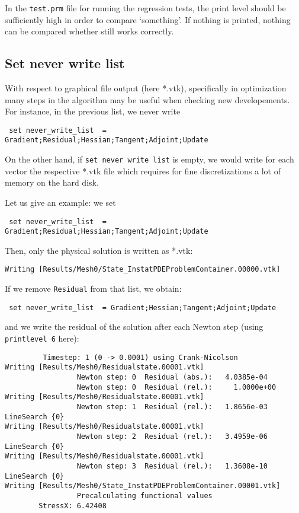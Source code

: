 \begin{remark}
In the \texttt{test.prm} file for running the regression tests, the print
level 
should be sufficiently high in order to compare `something'. If nothing 
is printed, nothing can be compared whether \dope{} still works correctly.
\end{remark}


\subsection{Set never write list}
With respect to graphical file output (here *.vtk), specifically in
optimization many steps in the algorithm may be useful when checking 
new developements. For instance, in the previous list, we never write 
\begin{verbatim}
 set never_write_list  = Gradient;Residual;Hessian;Tangent;Adjoint;Update
\end{verbatim}
On the other hand, if \texttt{set never write list} is empty, 
we would write for each vector the respective *.vtk file
which requires for fine discretizations a lot of memory on the hard disk.

Let us give an example: we set 
\begin{verbatim}
 set never_write_list  = Gradient;Residual;Hessian;Tangent;Adjoint;Update
\end{verbatim}
Then, only the physical solution is written as *.vtk:
\begin{verbatim}
Writing [Results/Mesh0/State_InstatPDEProblemContainer.00000.vtk]
\end{verbatim}
If we remove \texttt{Residual} from that list, we obtain:
\begin{verbatim}
 set never_write_list  = Gradient;Hessian;Tangent;Adjoint;Update
\end{verbatim}
and we write the residual of the solution after each Newton step (using
\texttt{printlevel 6} here):
\begin{verbatim}
         Timestep: 1 (0 -> 0.0001) using Crank-Nicolson
Writing [Results/Mesh0/Residualstate.00001.vtk]
                 Newton step: 0  Residual (abs.):   4.0385e-04
                 Newton step: 0  Residual (rel.):     1.0000e+00
Writing [Results/Mesh0/Residualstate.00001.vtk]
                 Newton step: 1  Residual (rel.):   1.8656e-03   LineSearch {0} 
Writing [Results/Mesh0/Residualstate.00001.vtk]
                 Newton step: 2  Residual (rel.):   3.4959e-06   LineSearch {0} 
Writing [Results/Mesh0/Residualstate.00001.vtk]
                 Newton step: 3  Residual (rel.):   1.3608e-10   LineSearch {0} 
Writing [Results/Mesh0/State_InstatPDEProblemContainer.00001.vtk]
                 Precalculating functional values 
        StressX: 6.42408
\end{verbatim}

